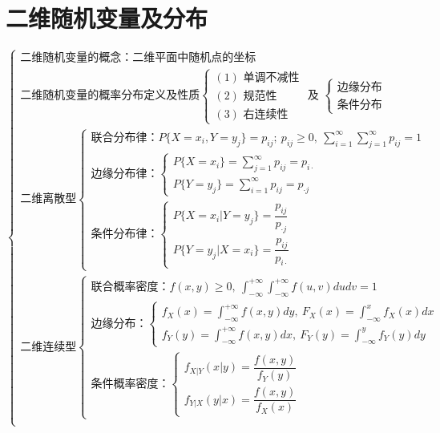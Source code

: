 \documentclass[lang=cn,11pt]{elegantbook}
\begin{document}
\chapter{二维随机变量及分布}
\[
\begin{cases}
\text{二维随机变量的概念：二维平面中随机点的坐标} \\
\text{二维随机变量的概率分布定义及性质}
\begin{cases}
(1) \text{ 单调不减性} \\
(2) \text{ 规范性} \\
(3) \text{ 右连续性}
\end{cases}
\text{ 及 }
\begin{cases}
\text{边缘分布} \\
\text{条件分布}
\end{cases} \\[6pt]

\text{二维离散型}
\begin{cases}
\text{联合分布律：} P\{X=x_i,Y=y_j\}=p_{ij};\ p_{ij}\geqslant0,\ \sum\limits_{i=1}^{\infty}\sum\limits_{j=1}^{\infty}p_{ij}=1 \\[8pt]
\text{边缘分布律：}
\begin{cases}
P\{X=x_i\}=\sum\limits_{j=1}^{\infty}p_{ij}=p_{i\cdot} \\[8pt]
P\{Y=y_j\}=\sum\limits_{i=1}^{\infty}p_{ij}=p_{\cdot j}
\end{cases} \\[12pt]
\text{条件分布律：}
\begin{cases}
P\{X=x_i|Y=y_j\}=\dfrac{p_{ij}}{p_{\cdot j}} \\[8pt]
P\{Y=y_j|X=x_i\}=\dfrac{p_{ij}}{p_{i\cdot}}
\end{cases}
\end{cases} \\[18pt]

\text{二维连续型}
\begin{cases}
\text{联合概率密度：} f(x,y)\geqslant0,\ \displaystyle\int_{-\infty}^{+\infty}\int_{-\infty}^{+\infty}f(u,v)dudv=1 \\[12pt]
\text{边缘分布：}
\begin{cases}
f_X(x)=\displaystyle\int_{-\infty}^{+\infty}f(x,y)dy,\ F_X(x)=\displaystyle\int_{-\infty}^{x}f_X(x)dx \\[12pt]
f_Y(y)=\displaystyle\int_{-\infty}^{+\infty}f(x,y)dx,\ F_Y(y)=\displaystyle\int_{-\infty}^{y}f_Y(y)dy
\end{cases} \\[18pt]
\text{条件概率密度：}
\begin{cases}
f_{X|Y}(x|y)=\dfrac{f(x,y)}{f_Y(y)} \\[8pt]
f_{Y|X}(y|x)=\dfrac{f(x,y)}{f_X(x)}
\end{cases}
\end{cases} \\[18pt]


\end{cases}\]
\end{document}
